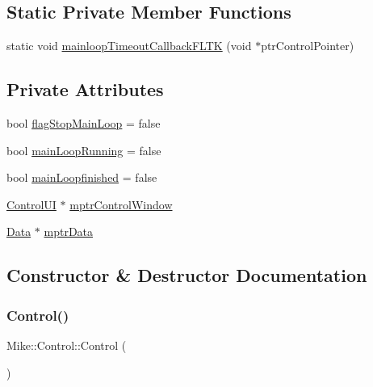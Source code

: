 \subsection*{Static Private Member Functions}
\begin{DoxyCompactItemize}
\item 
static void \hyperlink{class_mike_1_1_control_ac627d3cc73f39181fbfabfa01eb47f85}{mainloop\+Timeout\+Callback\+F\+L\+TK} (void $\ast$ptr\+Control\+Pointer)
\end{DoxyCompactItemize}
\subsection*{Private Attributes}
\begin{DoxyCompactItemize}
\item 
bool \hyperlink{class_mike_1_1_control_a800d1dc7b58dc3af7c081225009c898f}{flag\+Stop\+Main\+Loop} = false
\item 
bool \hyperlink{class_mike_1_1_control_af17a58f80bda54fda5b0a5167c8f04ed}{main\+Loop\+Running} = false
\item 
bool \hyperlink{class_mike_1_1_control_a7749b97976e1bb3e7ea49c7d63531dfc}{main\+Loopfinished} = false
\item 
\hyperlink{class_control_u_i}{Control\+UI} $\ast$ \hyperlink{class_mike_1_1_control_ae6eb65158d5ab90cebb53cb46abf3d3c}{mptr\+Control\+Window}
\item 
\hyperlink{class_mike_1_1_data}{Data} $\ast$ \hyperlink{class_mike_1_1_control_ad372b18cce9cd2fbd276df12bb4e886c}{mptr\+Data}
\end{DoxyCompactItemize}


\subsection{Constructor \& Destructor Documentation}
\mbox{\label{class_mike_1_1_control_ac9a2e3b56773b1eadab7297327a9fbcc}} 
\subsubsection{\texorpdfstring{Control()}{Control()}}
{\footnotesize\ttfamily Mike\+::\+Control\+::\+Control (\begin{DoxyParamCaption}{ }\end{DoxyParamCaption})}

